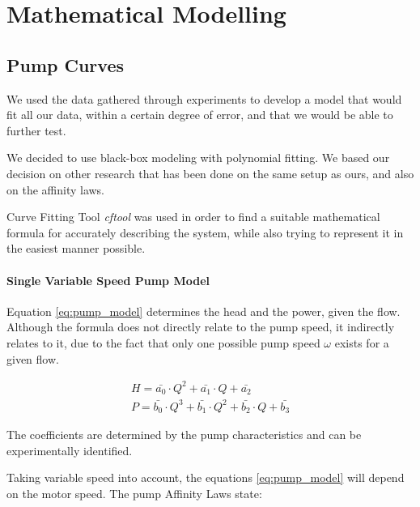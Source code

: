 \chapter{Mathematical Modelling}\label{ch:mathmodel}

\section{Pump Curves}\label{sec:pumpcurves}


We used the data gathered through experiments to develop a model that would fit all our data, within a certain degree of error, 
and that we would be able to further test.

We decided to use black-box modeling with polynomial fitting. We based our decision on other research that has been done on the same
setup as ours, and also on the affinity laws.

Curve Fitting Tool \cite{cftool} \textit{cftool} was used in order to find a suitable mathematical formula for accurately describing the 
system, while also trying to represent it in the easiest manner possible. 
\subsubsection{Single Variable Speed Pump Model}
Equation \ref{eq:pump_model} determines the head and the power, given the flow. 
Although the formula does not directly relate to the pump speed, it indirectly relates to it, due to the fact that only one possible 
pump speed $\omega$ exists for a given flow.

\begin{equation}
	\begin{aligned}
	H = \bar{a_{0}} \cdot Q^2 + \bar{a_{1}} \cdot Q + \bar{a_{2}} \\
	P = \bar{b_{0}} \cdot Q^3 + \bar{b_{1}} \cdot Q^2 + \bar{b_{2}} \cdot Q + \bar{b_{3}}
	\end{aligned}
	\label{eq:pump_model}
\end{equation}

The coefficients are determined by the pump characteristics and can be experimentally identified.

Taking variable speed into account, the equations \ref{eq:pump_model} will depend on the motor speed. 
The pump Affinity Laws state:

